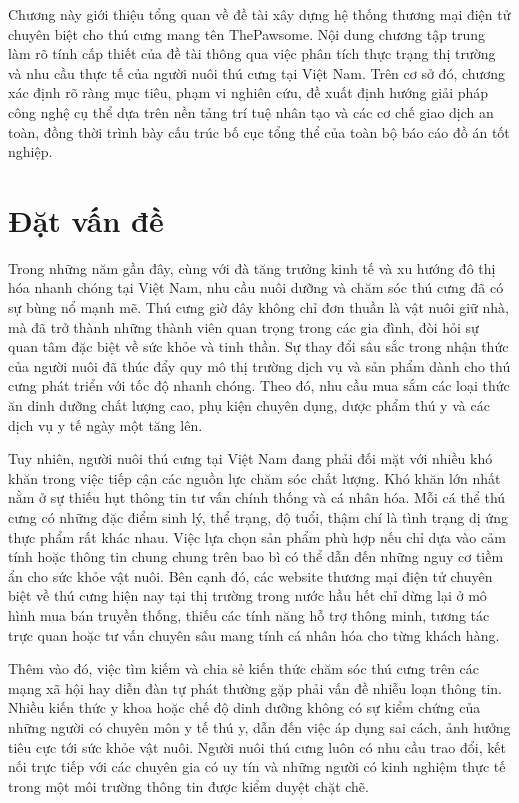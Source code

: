 \documentclass[../DoAn.tex]{subfiles}
\begin{document}
Chương này giới thiệu tổng quan về đề tài xây dựng hệ thống thương mại điện tử chuyên biệt cho thú cưng mang tên ThePawsome. Nội dung chương tập trung làm rõ tính cấp thiết của đề tài thông qua việc phân tích thực trạng thị trường và nhu cầu thực tế của người nuôi thú cưng tại Việt Nam. Trên cơ sở đó, chương xác định rõ ràng mục tiêu, phạm vi nghiên cứu, đề xuất định hướng giải pháp công nghệ cụ thể dựa trên nền tảng trí tuệ nhân tạo và các cơ chế giao dịch an toàn, đồng thời trình bày cấu trúc bố cục tổng thể của toàn bộ báo cáo đồ án tốt nghiệp.

\section{Đặt vấn đề}
\label{section:1.1}

Trong những năm gần đây, cùng với đà tăng trưởng kinh tế và xu hướng đô thị hóa nhanh chóng tại Việt Nam, nhu cầu nuôi dưỡng và chăm sóc thú cưng đã có sự bùng nổ mạnh mẽ. Thú cưng giờ đây không chỉ đơn thuần là vật nuôi giữ nhà, mà đã trở thành những thành viên quan trọng trong các gia đình, đòi hỏi sự quan tâm đặc biệt về sức khỏe và tinh thần. Sự thay đổi sâu sắc trong nhận thức của người nuôi đã thúc đẩy quy mô thị trường dịch vụ và sản phẩm dành cho thú cưng phát triển với tốc độ nhanh chóng. Theo đó, nhu cầu mua sắm các loại thức ăn dinh dưỡng chất lượng cao, phụ kiện chuyên dụng, dược phẩm thú y và các dịch vụ y tế ngày một tăng lên.

Tuy nhiên, người nuôi thú cưng tại Việt Nam đang phải đối mặt với nhiều khó khăn trong việc tiếp cận các nguồn lực chăm sóc chất lượng. Khó khăn lớn nhất nằm ở sự thiếu hụt thông tin tư vấn chính thống và cá nhân hóa. Mỗi cá thể thú cưng có những đặc điểm sinh lý, thể trạng, độ tuổi, thậm chí là tình trạng dị ứng thực phẩm rất khác nhau. Việc lựa chọn sản phẩm phù hợp nếu chỉ dựa vào cảm tính hoặc thông tin chung chung trên bao bì có thể dẫn đến những nguy cơ tiềm ẩn cho sức khỏe vật nuôi. Bên cạnh đó, các website thương mại điện tử chuyên biệt về thú cưng hiện nay tại thị trường trong nước hầu hết chỉ dừng lại ở mô hình mua bán truyền thống, thiếu các tính năng hỗ trợ thông minh, tương tác trực quan hoặc tư vấn chuyên sâu mang tính cá nhân hóa cho từng khách hàng.

Thêm vào đó, việc tìm kiếm và chia sẻ kiến thức chăm sóc thú cưng trên các mạng xã hội hay diễn đàn tự phát thường gặp phải vấn đề nhiễu loạn thông tin. Nhiều kiến thức y khoa hoặc chế độ dinh dưỡng không có sự kiểm chứng của những người có chuyên môn y tế thú y, dẫn đến việc áp dụng sai cách, ảnh hưởng tiêu cực tới sức khỏe vật nuôi. Người nuôi thú cưng luôn có nhu cầu trao đổi, kết nối trực tiếp với các chuyên gia có uy tín và những người có kinh nghiệm thực tế trong một môi trường thông tin được kiểm duyệt chặt chẽ.
\end{document}
